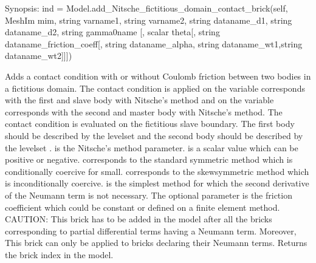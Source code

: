 \documentclass[a4paper,11pt,english]{sphinxmanual}
\begin{document}
\begin{fulllineitems}
\begin{fulllineitems}
\label{\detokenize{python/cmdref_Model:getfem.Model.add_Nitsche_fictitious_domain_contact_brick}}
Synopsis: ind = Model.add\_Nitsche\_fictitious\_domain\_contact\_brick(self, MeshIm mim, string varname1, string varname2, string dataname\_d1, string dataname\_d2, string gamma0name {[}, scalar theta{[}, string dataname\_friction\_coeff{[}, string dataname\_alpha, string dataname\_wt1,string dataname\_wt2{]}{]}{]})

Adds a contact condition with or without Coulomb friction between
two bodies in a fictitious domain. The contact condition is applied on 
the variable  corresponds with the first and slave body 
with Nitsche’s method and on the variable  corresponds 
with the second and master body with Nitsche’s method. 
The contact condition is evaluated on the fictitious slave boundary.
The first body should be described by the level\sphinxhyphen{}set  
and the second body should be described by the level\sphinxhyphen{}set .
 is the Nitsche’s method parameter. 
 is a scalar value which can be positive or negative. 
 corresponds to the standard symmetric method which is
conditionally coercive for   small.
 corresponds to the skew\sphinxhyphen{}symmetric method which is inconditionally coercive.
 is the simplest method for which the second derivative of
the Neumann term is not necessary. The optional parameter 
is the friction coefficient which could be constant or defined on a finite element method. 
CAUTION: This brick has to be added in the model after all the bricks
corresponding to partial differential terms having a Neumann term.
Moreover, This brick can only be applied to bricks declaring their
Neumann terms. Returns the brick index in the model.

\end{fulllineitems}


\end{fulllineitems}
\end{document}
